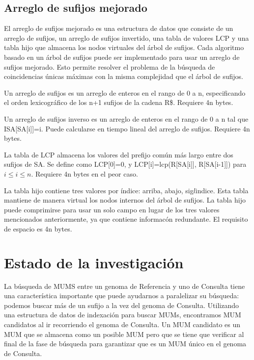 \documentclass[12pt,a4paper]{article}
\begin{document}
\subsection{Arreglo de sufijos mejorado}
El arreglo de sufijos mejorado es una estructura de datos que consiste de un arreglo de sufijos, un arreglo de sufijos invertido, una tabla de valores LCP y una tabla hijo que almacena los nodos virtuales del \'arbol de sufijos. Cada algoritmo basado en un \'arbol de sufijos puede ser implementado para usar un arreglo de sufijos mejorado. Esto permite resolver el problema de la b\'usqueda de coincidencias \'unicas m\'aximas con la misma complejidad que el \'arbol de sufijos.

Un arreglo de sufijos es un arreglo de enteros en el rango de 0 a n, especificando el orden lexicogr\'afico de los n+1 sufijos de la cadena R\$. Requiere 4n bytes.

Un arreglo de sufijos inverso es un arreglo de enteros en el rango de 0 a n tal que ISA[SA[i]]=i. Puede calcularse en tiempo lineal del arreglo de sufijos. Requiere 4n bytes.

La tabla de LCP almacena los valores del prefijo com\'un m\'as largo entre dos sufijos de SA. Se define como LCP[0]=0, y LCP[i]=lcp(R[SA[i]], R[SA[i-1]]) para $i\le i\le n$. Requiere 4n bytes en el peor caso.

La tabla hijo contiene tres valores por \'indice: arriba, abajo, sig$l$indice. Esta tabla mantiene de manera virtual los nodos internos del \'arbol de sufijos. La tabla hijo puede comprimirse para usar un solo campo en lugar de los tres valores mencionados anteriormente, ya que contiene informac\'on redundante. El requisito de espacio es 4n bytes.
\section{Estado de la investigación}
La búsqueda de MUMS entre un genoma de Referencia y uno de Consulta tiene una característica importante que puede ayudarnos a paralelizar su búsqueda: podemos buscar más de un sufijo a la vez del genoma de Consulta. Utilizando una estructura de datos de indexación para buscar MUMs, encontramos MUM candidatos al ir recorriendo el genoma de Consulta. Un MUM candidato es un MUM que se almacena como un posible MUM pero que se tiene que verificar al final de la fase de búsqueda para garantizar que es un MUM único en el genoma de Consulta.
\end{document}

